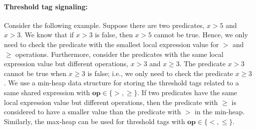 \documentclass[preprint]{sigplanconf}
\newtheorem{definition}{Definition}
\begin{document}
\paragraph{Threshold tag signaling:}
Consider the following example. Suppose there are two 
predicates, $x > 5$ and $x > 3$. We know that if $x > 3$ is false, then 
$x > 5$ cannot be true. Hence, we only need to check the predicate with the 
smallest local expression value for $>$ and $\ge$ operations. Furthermore, 
consider the predicates with the same local expression value but different 
operations, $x > 3$ and $x \ge 3$. The predicate $x > 3$ cannot be true when 
$x \ge 3$ is false; i.e., we only need to check the predicate $x \ge 3$. We use
a min-heap data structure for storing the threshold tags related to a same 
shared expression with $\boldsymbol{op} \in \{>, \ge\}$. If two predicates 
have the same local expression value but different operations, then the predicate 
with $\ge$ is considered to have a smaller value than the 
predicate with $>$ in the min-heap.
Similarly, the max-heap can be used for threshold tags with $\boldsymbol{op}
\in \{<, \le\}$. 


\end{document}
